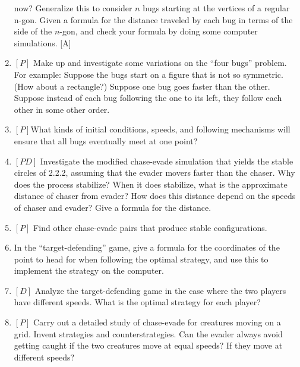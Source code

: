 \documentclass{book}
\begin{document}
\begin{enumerate}
now? Generalize this to consider $n$ bugs starting at the vertices of a
regular n-gon. Given a formula for the distance traveled by each bug in
terms of the side of the $n$-gon, and check your formula by doing some
computer simulations. [A]
\item $[P]$ Make up and investigate some variations on the ``four bugs''
problem. For example: Suppose the bugs start on a figure that is not so
symmetric. (How about a rectangle?) Suppose one bug goes faster than
the other. Suppose instead of each bug following the one to its left, they
follow each other in some other order.
\item $[P] $What kinds of initial conditions, speeds, and following mechanisms
will ensure that all bugs eventually meet at one point?
\item $[PD]$ Investigate the modified chase-evade simulation that yields the
stable circles of 2.2.2, assuming that the evader movers faster than the
chaser. Why does the process stabilize? When it does stabilize, what is
the approximate distance of chaser from evader? How does this distance
depend on the speeds of chaser and evader? Give a formula for the
distance.  
\item $[P]$ Find other chase-evade pairs that produce stable configurations.
\item In the ``target-defending'' game, give a formula for the coordinates
of the point to head for when following the optimal strategy, and use
this to implement the strategy on the computer.  
\item $[D]$ Analyze the target-defending game in the case where the two
players have different speeds. What is the optimal strategy for each
player?  
\item $[P]$ Carry out a detailed study of chase-evade for creatures moving on
a grid. Invent strategies and counterstrategies. Can the evader always
avoid getting caught if the two creatures move at equal speeds? If they
move at different speeds?
\end{enumerate}
\end{document}
